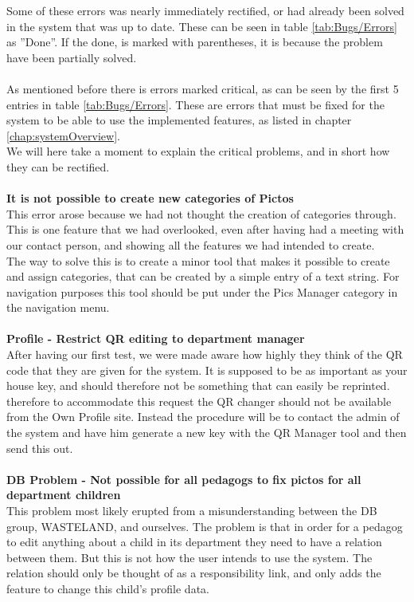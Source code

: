 Some of these errors was nearly immediately rectified, or had already been solved in the system that was up to date. These can be seen in table \ref{tab:Bugs/Errors} as ''Done''. If the done, is marked with parentheses, it is because the problem have been partially solved.\\
\\
As mentioned before there is errors marked critical, as can be seen by the first 5 entries in table \ref{tab:Bugs/Errors}. These are errors that must be fixed for the system to be able to use the implemented features, as listed in chapter \vref{chap:systemOverview}.\\
We will here take a moment to explain the critical problems, and in short how they can be rectified.\\
\\
\textbf{It is not possible to create new categories of Pictos}\\
This error arose because we had not thought the creation of categories through. This is one feature that we had overlooked, even after having had a meeting with our contact person, and showing all the features we had intended to create.\\
The way to solve this is to create a minor tool that makes it possible to create and assign categories, that can be created by a simple entry of a text string. For navigation purposes this tool should be put under the Pics Manager category in the navigation menu.\\
\\
\textbf{Profile - Restrict QR editing to department manager}\\
After having our first test, we were made aware how highly they think of the QR code that they are given for the system. It is supposed to be as important as your house key, and should therefore not be something that can easily be reprinted.\\
therefore to accommodate this request the QR changer should not be available from the Own Profile site. Instead the procedure will be to contact the admin of the system and have him generate a new key with the QR Manager tool and then send this out.\\
\\
\textbf{DB Problem - Not possible for all pedagogs to fix pictos for all department children}\\
This problem most likely erupted from a misunderstanding between the DB group, WASTELAND, and ourselves. The problem is that in order for a pedagog to edit anything about a child in its department they need to have a relation between them. But this is not how the user intends to use the system. The relation should only be thought of as a responsibility link, and only adds the feature to change this child’s profile data.\\
